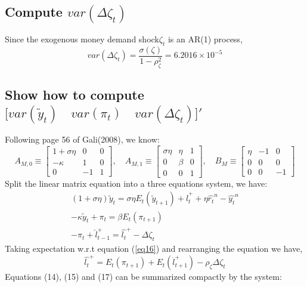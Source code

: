\documentclass[12pt]{article}
\begin{document}
\subsection{ Compute $var(\Delta\zeta_t)$}
Since the  exogenous money demand shock$\zeta_t$ is an AR(1) process,
\begin{equation}
var(\Delta\zeta_t) = \frac{\sigma(\zeta)}{1-\rho_{\zeta}^2} = 6.2016\times 10^{-5}
\end{equation}

\subsection{Show how to compute $\big[ var(\tilde{y}_t)\quad var(\pi_t) \quad var(\Delta\zeta_t) \big]'$}
Following page 56 of Gali(2008),  we know:
\begin{equation*}
A_{M,0}\equiv\left[
\begin{array}{ccc}
 1+\sigma\eta & 0  & 0  \\
  -\kappa& 1  & 0   \\
  0 & -1  &  1  
\end{array}
\right], \quad 
A_{M,1}\equiv\left[
\begin{array}{ccc}
 \sigma\eta & \eta  & 1  \\
  0& \beta  & 0   \\
  0 & 0  &  1  
\end{array}
\right], \quad 
B_{M}\equiv\left[
\begin{array}{ccc}
 \eta & -1 & 0  \\
 0& 0  & 0   \\
  0 & 0 &  -1  
\end{array}
\right]
\end{equation*}
Split the linear matrix equation into a three equations system, we have:
\begin{gather}
 (1+\sigma\eta)\tilde{y}_{t} = \sigma\eta E_{t}(\tilde{y}_{t+1})+\hat{l}_{t}^{+}+\eta\hat{r_{t}}^{n} - \hat{y_{t}}^{n}\\
 -\kappa\tilde{y}_{t} + \pi_{t} = \beta E_{t}(\pi_{t+1})\\
 - \pi_{t} +\hat{l}_{t-1}^{+} = \hat{l_{t}}^{+} - \Delta\zeta_{t} \label{eq16}
\end{gather}
Taking expectation w.r.t equation (\ref{eq16}) and rearranging the equation we have,
\begin{equation}
 \hat{l_{t}}^{+} = E_{t}(\pi_{t+1})+E_{t}( \hat{l}_{t+1}^{+})-\rho_{\zeta} \Delta\zeta_{t}
\end{equation}
Equations (14), (15) and (17)  can be summarized compactly by the system:
\end{document}
